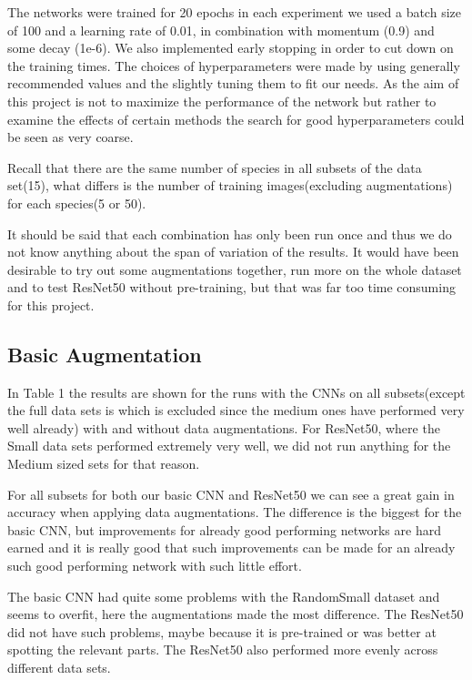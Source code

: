 \documentclass{article}
\begin{document}
The networks were trained for 20 epochs in each experiment we used a batch size of 100 and a learning rate of 0.01, in combination with momentum (0.9) and some decay (1e-6). We also implemented early stopping in order to cut down on the training times. The choices of hyperparameters were made by using generally recommended values and the slightly tuning them to fit our needs. As the aim of this project is not to maximize the performance of the network but rather to examine the effects of certain methods the search for good hyperparameters could be seen as very coarse.

Recall that there are the same number of species in all subsets of the data set(15), what differs is the number of training images(excluding augmentations) for each species(5 or 50).

It should be said that each combination has only been run once and thus we do not know anything about the span of variation of the results. It would have been desirable to try out some augmentations together, run more on the whole dataset and to test ResNet50 without pre-training, but that was far too time consuming for this project.

\subsection{Basic Augmentation}
In Table 1 the results are shown for the runs with the CNNs on all subsets(except the full data sets is which is excluded since the medium ones have performed very well already) with and without data augmentations. For ResNet50, where the Small data sets performed extremely very well, we did not run anything for the Medium sized sets for that reason. 

For all subsets for both our basic CNN and ResNet50 we can see a great gain in accuracy when applying data augmentations. The difference is the biggest for the basic CNN, but improvements for already good performing networks are hard earned and it is really good that such improvements can be made for an already such good performing network with such little effort. 

The basic CNN had quite some problems with the RandomSmall dataset and seems to overfit, here the augmentations made the most difference. The ResNet50 did not have such problems, maybe because it is pre-trained or was better at spotting the relevant parts. The ResNet50 also performed more evenly across different data sets. 
\end{document}
